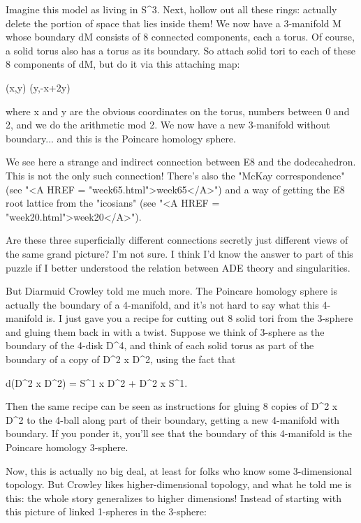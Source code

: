 Imagine this model as living in S^{3}.  Next, hollow out all
these rings: actually delete the portion of space that lies inside them!
We now have a 3-manifold M whose boundary dM consists of 8 connected
components, each a torus.  Of course, a solid torus also has a torus as
its boundary.  So attach solid tori to each of these 8 components of dM,
but do it via this attaching map:

(x,y) \to  (y,-x+2y)

where x and y are the obvious coordinates on the torus, numbers between 
0 and 2\pi , and we do the arithmetic mod 2\pi .  We now have a new 3-manifold 
without boundary... and this is the Poincare homology sphere.

We see here a strange and indirect connection between E8 and the
dodecahedron.  This is not the only such connection!  There's also the
"McKay correspondence" (see "<A HREF =
"week65.html">week65</A>") and a way of getting the E8 root lattice
from the "icosians" (see "<A HREF =
"week20.html">week20</A>").

Are these three superficially different connections secretly just 
different views of the same grand picture?   I'm not sure.  I think
I'd know the answer to part of this puzzle if I better understood
the relation between ADE theory and singularities.  

But Diarmuid Crowley told me much more.   The Poincare homology sphere
is actually the boundary of a 4-manifold, and it's not hard to say what
this 4-manifold is.  I just gave you a recipe for cutting out 8 solid
tori from the 3-sphere and gluing them back in with a twist.  Suppose 
we think of 3-sphere as the boundary of the 4-disk D^{4}, and think of 
each solid torus as part of the boundary of a copy of D^{2} x D^{2}, using
the fact that

d(D^{2} x D^{2}) = S^{1} x D^{2} + D^{2} x S^{1}.

Then the same recipe can be seen as instructions for gluing 8 copies 
of D^{2} x D^{2} to the 4-ball along part of their boundary, getting a new 
4-manifold with boundary.  If you ponder it, you'll see that the 
boundary of this 4-manifold is the Poincare homology 3-sphere.

Now, this is actually no big deal, at least for folks who know some
3-dimensional topology.  But Crowley likes higher-dimensional topology,
and what he told me is this: the whole story generalizes to higher 
dimensions!  Instead of starting with this picture of linked 1-spheres 
in the 3-sphere:


